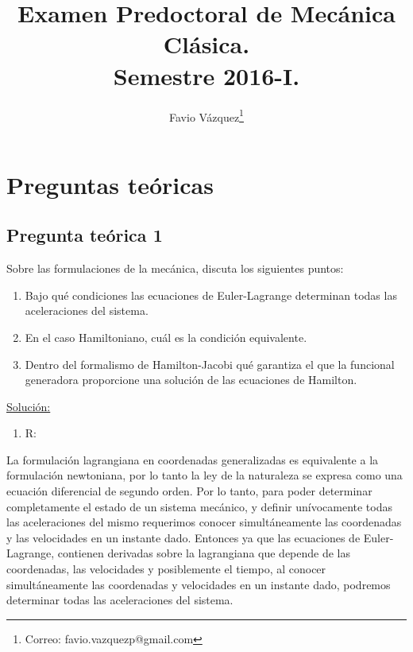 \documentclass[a4paper,10pt]{article}
\title{Examen Predoctoral de Mecánica Clásica. \\
Semestre 2016-I.}
\author{Favio Vázquez\thanks{Correo: favio.vazquezp@gmail.com}}\affil{Instituto de Ciencias Nucleares. Universidad Nacional Autónoma de México.}
\date{}
\numberwithin{equation}{section}
\begin{document}
\makeatletter
\def\@maketitle{%
  \newpage
  \null
  \vskip 2em%
  \begin{center}%
  \let \footnote \thanks
    {\Large\bfseries \@title \par}%
    \vskip 1.5em%
    {\normalsize
      \lineskip .5em%
      \begin{tabular}[t]{c}%
        \@author
      \end{tabular}\par}%
    \vskip 1em%
    {\normalsize \@date}%
  \end{center}%
  \par
  \vskip 1.5em}
\makeatother

\maketitle

\section{Preguntas teóricas}

\subsection{Pregunta teórica 1}

Sobre las formulaciones de la mecánica, discuta los siguientes puntos:

\begin{enumerate}[label=\alph*)]
 \item Bajo qué condiciones las ecuaciones de Euler-Lagrange determinan todas las aceleraciones del
 sistema.
 \item En el caso Hamiltoniano, cuál es la condición equivalente.
 \item Dentro del formalismo de Hamilton-Jacobi qué garantiza el que la funcional generadora
 proporcione una solución de las ecuaciones de Hamilton.
\end{enumerate}

\vspace{.3cm}

\underline{Solución:} \vspace{.3cm}

\begin{enumerate}[label=\alph*)]
 \item R:
\end{enumerate}

La formulación lagrangiana en coordenadas generalizadas es equivalente a la formulación 
newtoniana, por lo tanto la ley de la naturaleza se expresa como una ecuación diferencial 
de segundo orden. Por lo tanto, para poder determinar completamente el estado 
de un sistema mecánico, y definir unívocamente todas las aceleraciones del mismo 
requerimos conocer simultáneamente las coordenadas y las velocidades en un instante 
dado. Entonces ya que las ecuaciones de Euler-Lagrange, contienen derivadas 
sobre la lagrangiana que depende de las coordenadas, las velocidades y 
posiblemente el tiempo, al conocer simultáneamente las coordenadas y velocidades 
en un instante dado, podremos determinar todas las aceleraciones del sistema.
\end{document}
